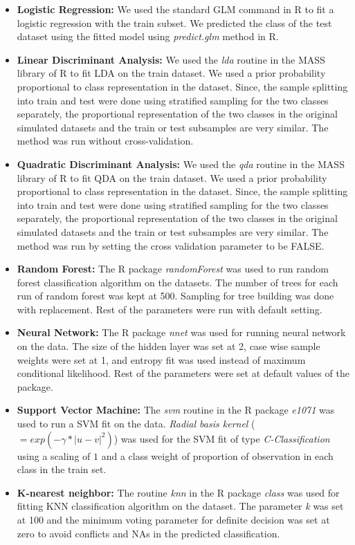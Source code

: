 \documentclass[twoside]{article}
\begin{document}
\begin{itemize}

\item \textbf{Logistic Regression:} We used the standard GLM command in R to fit a logistic regression with the train subset. We predicted the class of the test dataset using the fitted model using \textit{predict.glm} method in R.

\item \textbf{Linear Discriminant Analysis:} We used the \textit{lda} routine in the MASS library of R to fit LDA on the train dataset. We used a prior probability proportional to class representation in the dataset. Since, the sample splitting into train and test were done using stratified sampling for the two classes separately, the proportional representation of the two classes in the original simulated datasets and the train or test subsamples are very similar. The method was run without cross-validation. 

\item \textbf{Quadratic Discriminant Analysis:} We used the \textit{qda} routine in the MASS library of R to fit QDA on the train dataset. We used a prior probability proportional to class representation in the dataset. Since, the sample splitting into train and test were done using stratified sampling for the two classes separately, the proportional representation of the two classes in the original simulated datasets and the train or test subsamples are very similar. The method was run by setting the cross validation parameter to be FALSE. 

\item \textbf{Random Forest:} The R package \textit{randomForest} was used to run random forest classification algorithm on the datasets. The number of trees for each run of random forest was kept at 500. Sampling for tree building was done with replacement. Rest of the parameters were run with default setting. 

\item \textbf{Neural Network:} The R package \textit{nnet} was used for running neural network on the data. The size of the hidden layer was set at 2, case wise sample weights were set at 1, and entropy fit was used instead of maximum conditional likelihood. Rest of the parameters were set at default values of the package. 

\item \textbf{Support Vector Machine:} The \textit{svm} routine in the R package \textit{e1071} was used to run a SVM fit on the data. \textit{Radial basis kernel} ($=exp(-\gamma*|u-v|^2)$) was used for the SVM fit of type \textit{C-Classification} using a scaling of $1$ and a class weight of proportion of observation in each class in the train set. 

\item \textbf{K-nearest neighbor:} The routine \textit{knn} in the R package \textit{class} was used for fitting KNN classification algorithm on the dataset. The parameter \textit{k} was set at 100 and the minimum voting parameter for definite decision was set at zero to avoid conflicts and NAs in the predicted classification. 

\end{itemize}
\end{document}
